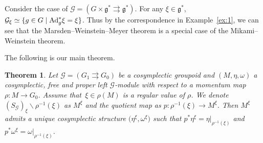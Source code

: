 \documentclass[pdftex]{sigma}
\numberwithin{equation}{section}
\newtheorem{Theorem}{Theorem}[section]
\begin{document}
\begin{Example}
 Consider the case of $\mathcal{G}=(G\times\mathfrak{g}^\ast\rightrightarrows\mathfrak{g}^\ast)$. For any $\xi\in\mathfrak{g}^\ast$, ${\mathcal{G}_\xi\simeq\{g\in G\mid{\rm Ad}^\ast_g\xi=\xi\}}$. Thus by the correspondence in Example~\ref{ex:1}, we can see that the Marsden--Weinstein--Meyer theorem is a special case of the Mikami--Weinstein theorem.
\end{Example}

The following is our main theorem.

\begin{Theorem}\label{thm:3}
 Let $\mathcal{G}=(G_1\rightrightarrows G_0)$ be a cosymplectic groupoid and $(M,\eta,\omega)$ a cosymplectic, free and proper left $\mathcal{G}$-module with respect to a momentum map $\rho\colon M\to G_0$. Assume that~${\xi\in\rho(M)}$ is a regular value of $\rho$. We denote $(S_{\mathcal{G}})_\xi\backslash \rho^{-1}(\xi)$ as $M^\xi$ and the quotient map as $p\colon\rho^{-1}(\xi)\to M^\xi$. Then $M^\xi$ admits a unique cosymplectic structure $\bigl(\eta^\xi,\omega^\xi\bigr)$ such that $p^\ast\eta^\xi=\eta|_{\rho^{-1}(\xi)}$ and $p^\ast\omega^\xi=\omega|_{\rho^{-1}(\xi)}$.
\end{Theorem}
\end{document}
